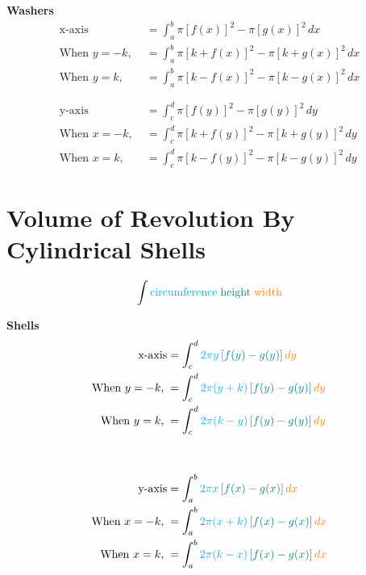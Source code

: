 \begin{framed}
  \noindent \textbf{Washers}
  \begin{align*}
    \text{x-axis} &= \int_a^b \pi [f(x)]^2 - \pi [g(x)]^2 \, dx\\
    \text{When } y=-k, \; &= \int_a^b \pi [k+f(x)]^2 - \pi [k+g(x)]^2 \, dx\\
    \text{When } y=k, \; &= \int_a^b \pi [k-f(x)]^2 - \pi [k-g(x)]^2 \, dx\\\\\\
    \text{y-axis} &= \int_c^d \pi [f(y)]^2 - \pi [g(y)]^2 \, dy\\
    \text{When } x=-k, \; &= \int_c^d \pi [k+f(y)]^2 - \pi [k+g(y)]^2 \, dy\\
    \text{When } x=k, \; &= \int_c^d \pi [k-f(y)]^2 - \pi [k-g(y)]^2 \, dy
  \end{align*}
\end{framed}


\section{Volume of Revolution By Cylindrical Shells}

\begin{equation*}
  \int \text{\textcolor{cyan}{circumference}} \;
       \text{\textcolor{teal}{height}} \;
       \text{\textcolor{orange}{width}}
\end{equation*}

\begin{framed}
  \noindent \textbf{Shells}
  \begin{align*}
    \text{x-axis} &= \int_c^d \textcolor{cyan}{2\pi y} \,
    \textcolor{teal}{[f(y)-g(y)]} \, \textcolor{orange}{dy}\\
    \text{When } y=-k, \; &= \int_c^d \textcolor{cyan}{2\pi (y+k)} \,
    \textcolor{teal}{[f(y)-g(y)]} \, \textcolor{orange}{dy}\\
    \text{When } y=k, \; &= \int_c^d \textcolor{cyan}{2\pi (k-y)} \,
    \textcolor{teal}{[f(y)-g(y)]} \, \textcolor{orange}{dy}\\\\\\
    \text{y-axis} &= \int_a^b \textcolor{cyan}{2\pi x} \,
    \textcolor{teal}{[f(x)-g(x)]} \, \textcolor{orange}{dx}\\
    \text{When } x=-k, \; &= \int_a^b \textcolor{cyan}{2\pi (x+k)} \,
    \textcolor{teal}{[f(x)-g(x)]} \, \textcolor{orange}{dx}\\
    \text{When } x=k, \; &= \int_a^b \textcolor{cyan}{2\pi (k-x)} \,
    \textcolor{teal}{[f(x)-g(x)]} \, \textcolor{orange}{dx}
  \end{align*}
\end{framed}